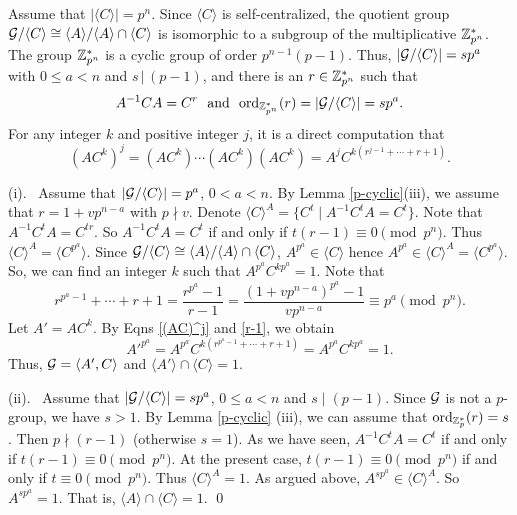 \documentclass{article}
\numberwithin{equation}{section}
\begin{document}
Assume that $|\langle C\rangle|=p^n$.
Since $\langle C\rangle$ is self-centralized,
the quotient group ${\cal G}/\langle C\rangle
\cong\langle A\rangle/\langle A\rangle\cap\langle C\rangle$
is isomorphic to a subgroup of the multiplicative ${\Bbb Z}_{p^n}^*$.
The group ${\Bbb Z}_{p^n}^*$ is a cyclic group of order $p^{n-1}(p-1)$.
Thus, $|{\cal G}/\langle C\rangle|=sp^a$ with $0\le a<n$ and $s\,|\,(p-1)$,
and there is an $r\in{\Bbb Z}_{p^n}^*$ such that
\begin{equation}\label{r}
 A^{-1}CA=C^r~~\mbox{and}~~
 {\rm ord}_{{\Bbb Z}_{p^n}^*}(r)=|{\cal G}/\langle C\rangle|=sp^a.
\end{equation}
For any integer $k$ and positive integer $j$, it is a direct computation that
\begin{equation}\label{(AC)^j}
(AC^k)^j=(AC^k)\cdots(AC^k)(AC^k)=A^{j}C^{k(r^{j-1}+\cdots+r+1)}.
\end{equation}

(i).~ Assume that $|{\cal G}/\langle C\rangle|=p^a$,  $0<a<n$.
By Lemma \ref{p-cyclic}(iii), we assume that $r=1+vp^{n-a}$ with $p\nmid v$.
Denote $\langle C\rangle^A=\{C^t\mid A^{-1}C^tA=C^t\}$.
Note that $A^{-1}C^tA=C^{tr}$. So
$A^{-1}C^tA=C^t$ if and only if $t(r-1)\equiv 0\pmod{p^n}$.
Thus $\langle C\rangle^A =\langle C^{p^a}\rangle$.
Since ${\cal G}/\langle C\rangle
\cong\langle A\rangle/\langle A\rangle\cap\langle C\rangle$,
$A^{p^a}\in\langle C\rangle$ hence
$A^{p^a}\in\langle C\rangle^A=\langle C^{p^a}\rangle$.
So, we can find an integer $k$ such that $A^{p^a}C^{kp^a}=1$.
Note that
\begin{equation}\label{r-1}
r^{p^a-1}+\cdots+r+1=\frac{r^{p^a}-1}{r-1}
=\frac{(1+vp^{n-a})^{p^a}-1}{vp^{n-a}} \equiv p^a\pmod{p^n}.
\end{equation}
Let $A'=AC^k$. By Eqns \eqref{(AC)^j} and \eqref{r-1},  we obtain
$$
A'^{p^a}=A^{p^a}C^{k(r^{p^a-1}+\cdots+r+1)}=A^{p^a}C^{kp^a}=1.
$$
Thus, ${\cal G}=\langle A',C\rangle$ and
$\langle A'\rangle\cap\langle C\rangle=1$.

(ii).~ Assume that $|{\cal G}/\langle C\rangle|=sp^a$, $0\le a<n$ and $s\mid(p-1)$.
Since ${\cal G}$ is not a $p$-group, we have $s>1$.
By Lemma \ref{p-cyclic} (iii), we can assume that
${\rm ord}_{{\Bbb Z}_{p}^*}(r)=s$. Then $p\nmid(r-1)$ (otherwise $s=1$).
As we have seen, $A^{-1}C^tA=C^t$ if and only if $t(r-1)\equiv 0\pmod{p^n}$.
At the present case, $t(r-1)\equiv 0\pmod{p^n}$ 
if and only if $t\equiv 0\pmod{p^n}$. Thus $\langle C\rangle^A=1$.
As argued above, $A^{sp^a}\in\langle C\rangle^A$.
So $A^{sp^a}=1$. That is, $\langle A\rangle\cap\langle C\rangle=1$.
\qed
\end{document}
